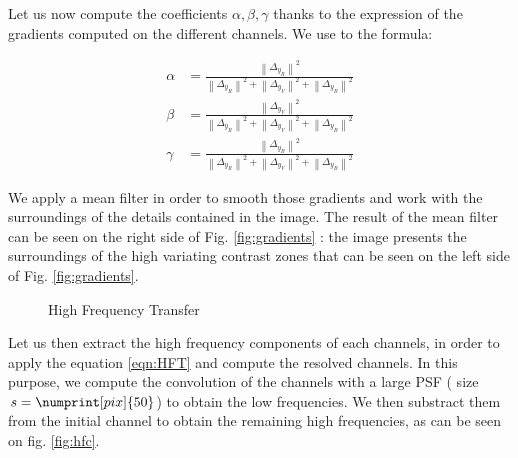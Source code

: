 \documentclass[10pt,letterpaper]{article}
\begin{document}
Let us now compute the coefficients $\alpha,\beta,\gamma$ thanks to the expression of the gradients computed on the different channels. We use to the formula:

$$
\begin{aligned}
\alpha & =\frac{\left\|\Delta_{y_R}\right\|^2}{\left\|\Delta_{y_R}\right\|^2+\left\|\Delta_{y_V}\right\|^2+\left\|\Delta_{y_B}\right\|^2} \\ 
\beta & =\frac{\left\|\Delta_{y_V}\right\|^2}{\left\|\Delta_{y_R}\right\|^2+\left\|\Delta_{y_V}\right\|^2+\left\|\Delta_{y_B}\right\|^2} \\ 
\gamma & =\frac{\left\|\Delta_{y_B}\right\|^2}{\left\|\Delta_{y_R}\right\|^2+\left\|\Delta_{y_V}\right\|^2+\left\|\Delta_{y_B}\right\|^2}\end{aligned}
$$

We apply a mean filter in order to smooth those gradients and work with the surroundings of the details contained in the image. The result of the mean filter can be seen on the right side of Fig. \ref{fig:gradients} : the image presents the surroundings of the high variating contrast zones that can be seen on the left side of Fig. \ref{fig:gradients}.

\begin{figure}[h]
    \centering
	\caption{High Frequency Transfer}
\end{figure}

Let us then extract the high frequency components of each channels, in order to apply the equation \ref{eqn:HFT} and compute the resolved channels. In this purpose, we compute the convolution of the channels with a large PSF ( size $s = \numprint[pix]{50}$) to obtain the low frequencies.  We then substract them from the initial channel to obtain the remaining high frequencies, as can be seen on fig. \ref{fig:hfc}.
\end{document}
